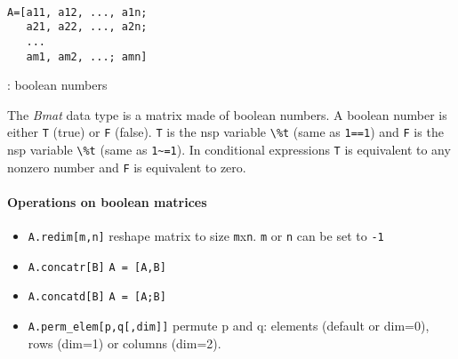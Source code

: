 
\begin{mandesc}
   \\
\end{mandesc}
\begin{calling_sequence}
\begin{verbatim}
A=[a11, a12, ..., a1n;
   a21, a22, ..., a2n;
   ...
   am1, am2, ...; amn]
\end{verbatim}
\end{calling_sequence}
\begin{parameters}
  \begin{varlist}
    : boolean numbers
  \end{varlist}
\end{parameters}

\begin{mandescription}
The \emph{Bmat} data type is a matrix made of boolean numbers. 
A boolean number is either \verb+T+ (true) or \verb+F+ (false). 
\verb+T+ is the nsp variable \verb+\%t+ (same as \verb+1==1+)
and \verb+F+ is the nsp variable \verb+\%t+ (same as \verb+1~=1+).
In conditional expressions \verb+T+ is equivalent to any nonzero
number and \verb+F+ is equivalent to zero.
\end{mandescription}

\paragraph{Operations on boolean matrices}
\begin{itemize}
\item \verb+A.redim[m,n]+ reshape matrix to size \verb+m+x\verb+n+. \verb+m+ or \verb+n+ can be set to \verb+-1+ 
\item \verb+A.concatr[B]+ \verb+A = [A,B]+
\item \verb+A.concatd[B]+ \verb+A = [A;B]+
\item \verb+A.perm_elem[p,q[,dim]]+ permute p and q: elements
  (default or dim=0), rows (dim=1) or columns (dim=2).
\end{itemize}

